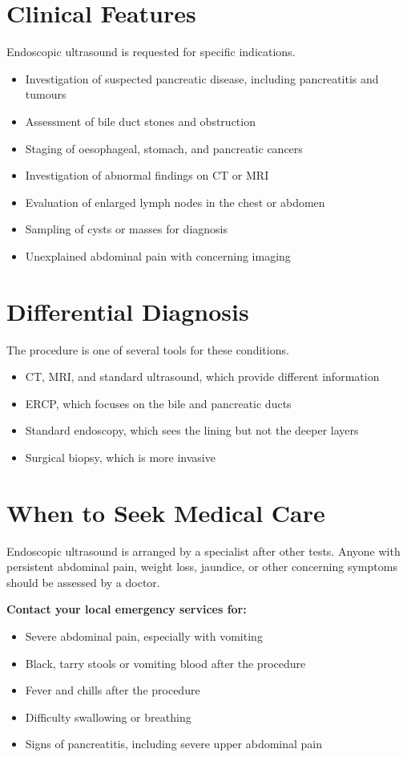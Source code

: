 \section*{Clinical Features}
Endoscopic ultrasound is requested for specific indications.
\begin{itemize}
    \item Investigation of suspected pancreatic disease, including pancreatitis and tumours
    \item Assessment of bile duct stones and obstruction
    \item Staging of oesophageal, stomach, and pancreatic cancers
    \item Investigation of abnormal findings on CT or MRI
    \item Evaluation of enlarged lymph nodes in the chest or abdomen
    \item Sampling of cysts or masses for diagnosis
    \item Unexplained abdominal pain with concerning imaging
\end{itemize}

\section*{Differential Diagnosis}
The procedure is one of several tools for these conditions.
\begin{itemize}
    \item CT, MRI, and standard ultrasound, which provide different information
    \item ERCP, which focuses on the bile and pancreatic ducts
    \item Standard endoscopy, which sees the lining but not the deeper layers
    \item Surgical biopsy, which is more invasive
\end{itemize}

\section*{When to Seek Medical Care}
Endoscopic ultrasound is arranged by a specialist after other tests. Anyone with persistent abdominal pain, weight loss, jaundice, or other concerning symptoms should be assessed by a doctor.

\textbf{Contact your local emergency services for:}
\begin{itemize}
    \item Severe abdominal pain, especially with vomiting
    \item Black, tarry stools or vomiting blood after the procedure
    \item Fever and chills after the procedure
    \item Difficulty swallowing or breathing
    \item Signs of pancreatitis, including severe upper abdominal pain
\end{itemize}

